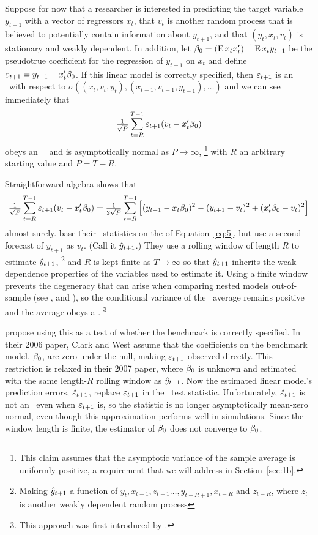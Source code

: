 \documentclass[12pt,fleqn]{article}
\begin{document}
Suppose for now that a researcher is interested in
predicting the target variable $y_{t+1}$ with a vector of regressors
$x_t$, that $v_t$ is another random process that is believed to
potentially contain information about $y_{t+1}$, and that
$(y_t, x_t, v_t)$ is stationary and weakly dependent.
In addition,
let $\btrue = (\E x_t x_t')^{-1} \E x_t y_{t+1}$ be the pseudotrue
coefficient for the regression of $y_{t+1}$ on $x_t$ and define
$\ep_{t+1} = y_{t+1} - x_t'\btrue$.  If this linear model is
correctly specified, then $\varepsilon_{t+1}$ is an \mds\ with respect
to $\sigma((x_t, v_t, y_t), (x_{t-1}, v_{t-1}, y_{t-1}),\dots)$
and we can see immediately that
\begin{equation}
  \label{eq:4}
  \oclt{t} \ep_{t+1} (v_t - x_t'\btrue)
\end{equation}
obeys an \mds\ \clt\ and is asymptotically normal as $P \to \infty$,%
\footnote{This claim assumes that the asymptotic variance of the
  sample average is uniformly positive, a requirement that we will
  address in Section~\ref{sec:1b}.} %
with $R$ an arbitrary starting value
and $P = T - R$.

Straightforward algebra \citep{ClW:07} shows that
\begin{equation}
  \label{eq:5}
  \tfrac{1}{\sqrt{P}} \osum{t} \ep_{t+1} (v_t -
  x_t'\btrue) = \tfrac{1}{2 \sqrt{P}} \osum{t} \Big[(y_{t+1} -
  x_t\btrue)^2 - (y_{t+1} - v_t)^2 + (x_t'\btrue - v_t)^2 \Big]
\end{equation}
almost surely.
\citet{ClW:06,ClW:07} base their \oos\ statistics on the  of
Equation~\eqref{eq:5}, but use a second forecast of $y_{t+1}$ as
$v_t$. (Call it $\hat{y}_{t+1}$.) They use a rolling window of length
$R$ to estimate $\hat{y}_{t+1}$,%
\footnote{Making $\hat{y}_{t+1}$ a function of $y_t, x_{t-1}, z_{t-1}
\dots, y_{t-R+1}, x_{t-R}$ and $z_{t-R}$, where $z_t$ is another weakly
dependent random process} %
and $R$ is kept finite as $T \to \infty$ so that
$\hat{y}_{t+1}$ inherits the weak dependence properties of the
variables used to estimate it. Using a finite window prevents
the degeneracy that can arise when comparing nested models out-of-sample (see
\citealp{ClM:01}, and \citealp{Mcc:07}), so the conditional variance
of the \oos\ average remains positive and the average obeys a \clt.%
\footnote{This approach was first introduced by \citet{GiW:06}.} %

\citet{ClW:06,ClW:07} propose using this as a test of whether the benchmark is correctly specified.
In their 2006 paper, Clark and West assume that the
coefficients on the benchmark model, $\btrue$, are zero under the null, making
$\varepsilon_{t+1}$ observed directly. This restriction is relaxed in
their 2007 paper, where $\btrue$ is unknown and estimated with the same length-$R$
rolling window as $\hat{y}_{t+1}$. Now the estimated linear model's prediction errors,
$\hat{\varepsilon}_{t+1}$, replace $\varepsilon_{t+1}$ in the \oos\
test statistic. Unfortunately, $\hat{\varepsilon}_{t+1}$ is not an
\mds\ even when $\varepsilon_{t+1}$ is, so the statistic is no longer
asymptotically mean-zero normal, even though this approximation
performs well in simulations. Since the window length is finite,
the estimator of $\btrue$ does not converge to $\btrue$.
\end{document}
